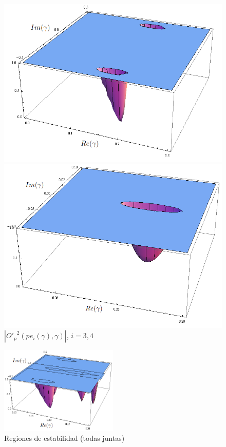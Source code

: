\begin{figure}[h!!!]
	\begin{minipage}[m]{0.49\linewidth}%
		\centering \includegraphics[width=.6\textwidth]{Est_pe12.png}
		\caption{$\left|{O'_{p}}^2\left(pe_i(\gamma),\gamma\right)\right|$, $i=1,2$}\label{est1}
	\end{minipage}
	\begin{minipage}[m]{0.49\linewidth}%
		\centering \includegraphics[width=.6\textwidth]{Est_pe23.png}
		\caption{$\left|{O'_{p}}^2\left(pe_i(\gamma),\gamma\right)\right|$, $i=3,4$}\label{est2}
	\end{minipage}
\end{figure}


\begin{figure}[h!!!]
	\centering
	\includegraphics[width=0.5\textwidth]{Est_all2.png}
	\caption{Regiones de estabilidad (todas juntas)}\label{estall}
\end{figure}

